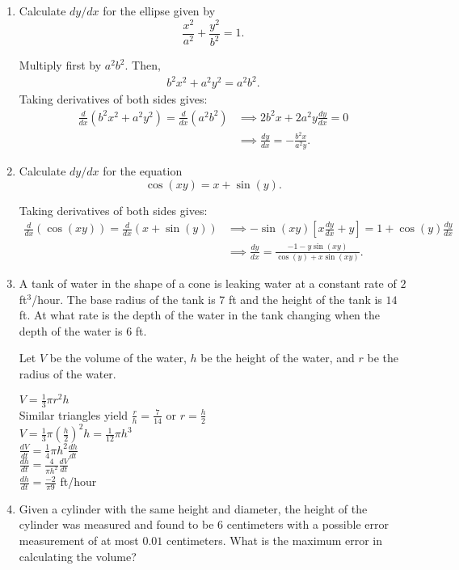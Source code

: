 \documentclass{article}
\begin{document}
\begin{enumerate}[label = \arabic*)]
	\item Calculate $dy/dx$ for the ellipse given by
	$$\frac{x^2}{a^2}+\frac{y^2}{b^2} = 1.$$
	\par 
	Multiply first by $a^2b^2$.  Then,
	\begin{align*}
		b^2x^2+a^2y^2 = a^2b^2.
	\end{align*}
	Taking derivatives of both sides gives:
	\begin{align*}
		\frac{d}{dx}(b^2x^2+a^2y^2) = \frac{d}{dx}(a^2b^2) & \implies 2b^2x+2a^2y\frac{dy}{dx} = 0 \\
		& \implies \frac{dy}{dx} = -\frac{b^2x}{a^2y}. 
	\end{align*}
	\item Calculate $dy/dx$ for the equation
	$$\cos(xy) = x+\sin(y).$$
	\par 
	Taking derivatives of both sides gives:
	\begin{align*}
		\frac{d}{dx}(\cos(xy)) = \frac{d}{dx}(x+\sin(y)) & \implies  -\sin(xy)\left[x\frac{dy}{dx}+y\right] = 1+\cos(y)\frac{dy}{dx} \\
		& \implies \frac{dy}{dx} = \frac{-1-y\sin(xy)}{\cos(y)+x\sin(xy)}.
	\end{align*}
	
	\item A tank of water in the shape of a cone is leaking water at a constant rate of $2$ ft$^3$/hour. The base radius of the tank is $7$ ft and the height of the tank is $14$ ft. At what rate is the depth of the water in the tank changing when the depth of the water is $6$ ft.
	
	Let $V$ be the volume of the water, $h$ be the height of the water, and $r$ be the radius of the water. 
	
	\begin{center}
	    $V = \frac{1}{3}\pi r^2 h$\\
	    Similar triangles yield
	    $\frac{r}{h} = \frac{7}{14}$ or $r = \frac{h}{2}$ \\
	    $V = \frac{1}{3}\pi (\frac{h}{2})^2 h = \frac{1}{12}\pi h^3 $\\
	    $\frac{dV}{dt} = \frac{1}{4}\pi h^2 \frac{dh}{dt}$\\
	    $ \frac{dh}{dt} = \frac{4}{\pi h^2} \frac{dV}{dt}$\\
	    $ \frac{dh}{dt} = \frac{-2}{\pi 9} $ ft/hour\\
	\end{center}
	
	\item Given a cylinder with the same height and diameter, the height of the cylinder was measured and found to be $6$ centimeters with a possible error measurement of at most $0.01$ centimeters. What is the maximum error in calculating the volume?
	

\end{enumerate}
\end{document}
